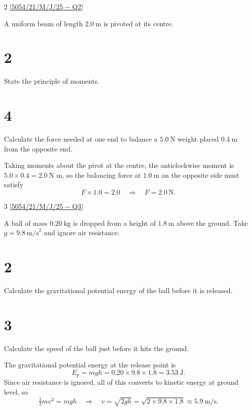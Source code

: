 \documentclass[11pt]{article}
\begin{document}
\begin{question}{2}
\ref{5054/21/M/J/25 -- Q2}

\qtext
A uniform beam of length $2.0\ \text{m}$ is pivoted at its centre.

\part{2} State the principle of moments.

\part{4} Calculate the force needed at one end to balance a $5.0\ \text{N}$ weight placed $0.4\ \text{m}$ from the opposite end.
\endq

\markscheme
{}
\endms

\exemplar
Taking moments about the pivot at the centre, the anticlockwise moment
is $5.0 \times 0.4 = 2.0\ \text{N m}$, so the balancing force at
$1.0\ \text{m}$ on the opposite side must satisfy
$$ F \times 1.0 = 2.0 \quad \Rightarrow \quad F = 2.0\ \text{N}. $$
\endexemplar
\end{question}

\begin{question}{3}
\ref{5054/21/M/J/25 -- Q3}

\qtext
A ball of mass $0.20\ \text{kg}$ is dropped from a height of $1.8\ \text{m}$
above the ground. Take $g = 9.8\ \text{m/s}^2$ and ignore air resistance.

\part{2} Calculate the gravitational potential energy of the ball before it is released.

\part{3} Calculate the speed of the ball just before it hits the ground.
\endq

\markscheme
{}
\endms

\exemplar
The gravitational potential energy at the release point is
$$ E_p = mgh = 0.20 \times 9.8 \times 1.8 = 3.53\ \text{J}. $$
Since air resistance is ignored, all of this converts to kinetic energy
at ground level, so
$$ \tfrac{1}{2}mv^{2} = mgh \quad\Rightarrow\quad v = \sqrt{2gh} = \sqrt{2 \times 9.8 \times 1.8} \approx 5.9\ \text{m/s}. $$
\endexemplar
\end{question}
\end{document}
